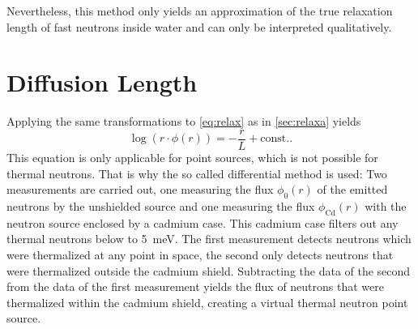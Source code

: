 Nevertheless, this method only yields an approximation of the true relaxation length of fast neutrons inside water and can only be interpreted qualitatively.

\section{Diffusion Length}
Applying the same transformations to \autoref{eq:relax} as in \autoref{sec:relaxa} yields
\begin{equation*}
	\log(r\cdot\phi(r)) = -\frac{r}{L} + \text{const.}.
\end{equation*}
This equation is only applicable for point sources, which is not possible for thermal neutrons.
That is why the so called  differential method is used:
Two measurements are carried out, one measuring the flux $\phi_0(r)$ of the emitted neutrons by the unshielded source and one measuring the flux $\phi_\text{Cd}(r)$ with the neutron source enclosed by a cadmium case.
This cadmium case filters out any thermal neutrons below to \SI{5}{meV}.
The first measurement detects neutrons which were thermalized at any point in space, the second only detects neutrons that were thermalized outside the cadmium shield.
Subtracting the data of the second from the data of the first measurement yields the flux of neutrons that were thermalized within the cadmium shield, creating a virtual thermal neutron point source.
